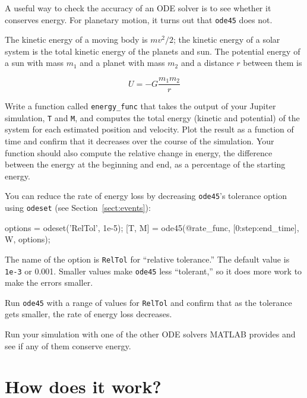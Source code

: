 \documentclass[
]{book}
\numberwithin{Answer}{chapter}
\numberwithin{Exercise}{chapter}
\begin{document}
A useful way to check the accuracy of an ODE solver is to
see whether it conserves energy.  For planetary
motion, it turns out that {\tt ode45} does not.

The kinetic energy of a moving body is $m v^2 / 2$; the
kinetic energy of a solar system is the total kinetic
energy of the planets and sun.
The potential energy of a sun with mass $m_1$ and a
planet with mass $m_2$ and a distance $r$ between them is

\begin{equation}
U = -G \frac{m_1 m_2}{r}
\end{equation}

\begin{ex}
Write a function called {\tt energy\_func} that takes the output of
your Jupiter simulation, {\tt T} and {\tt M}, and computes the total
energy (kinetic and potential) of the system for each estimated
position and velocity.  Plot the result as a function of time and
confirm that it decreases over the course of the simulation.  Your
function should also compute the relative change in energy, the
difference between the energy at the beginning and end, as a
percentage of the starting energy.
\end{ex}

You can reduce the rate of energy loss by decreasing {\tt ode45}'s
tolerance option using {\tt odeset} (see Section~\ref{sect:events}):

\begin{code}
options = odeset('RelTol', 1e-5);
[T, M] = ode45(@rate_func, [0:step:end_time], W, options);
\end{code}
%
The name of the option is {\tt RelTol} for ``relative tolerance.''
The default value is {\tt 1e-3} or 0.001.  Smaller values
make {\tt ode45} less ``tolerant,'' so it does more work to
make the errors smaller.

\begin{ex}
Run {\tt ode45} with a range of values for {\tt RelTol} and confirm
that as the tolerance gets smaller, the rate of energy loss
decreases.
\end{ex}

\begin{ex}
Run your simulation with one of the other ODE solvers MATLAB provides
and see if any of them conserve energy.
\end{ex}



\chapter{How does it work?}
\end{document}
